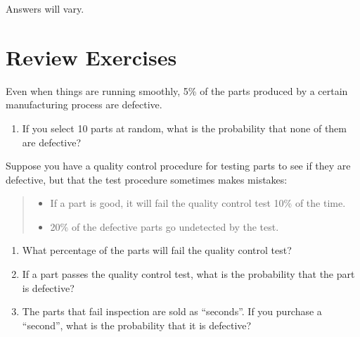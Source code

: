 \documentclass[twoside]{book}\usepackage[]{graphicx}\usepackage[]{xcolor}
\begin{document}
\begin{solution}
Answers will vary.
\end{solution}

\shipoutProblems


\newpage

\section*{Review Exercises}

\begin{problem}
Even when things are running smoothly, 5\% of the parts 
produced by a certain manufacturing process are defective.
\begin{enumerate}
\item
If you select 10 parts at random, what is the probability
that none of them are defective?
\end{enumerate}
Suppose you have a quality control procedure for testing parts 
to see if they are defective, 
but that the test procedure sometimes makes mistakes:
\begin{quote}
\begin{itemize}
\item
If a part is good, it will fail the quality control test 10\% of the time.
\item
20\% of the defective parts go undetected by the test.
\end{itemize}
\end{quote}

\begin{enumerate}
\item
What percentage of the parts will fail the quality control test?
\item
If a part passes the quality control test, what is the probability
that the part is defective?
\item
	The parts that fail inspection are sold as ``seconds''.
	If you purchase a ``second'', what is the probability that it is 
	defective?
\end{enumerate}
\end{problem}
\end{document}
